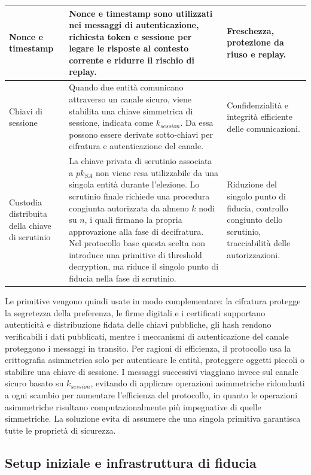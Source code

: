 \documentclass[a4paper,12pt]{article}
\begin{document}
\begin{longtable}{|>{\raggedright\arraybackslash}p{}|>{\raggedright\arraybackslash}p{}|>{\raggedright\arraybackslash}p{}|}
	Nonce e timestamp &
	Nonce e timestamp sono utilizzati nei messaggi di autenticazione, richiesta token e sessione per legare le risposte al contesto corrente e ridurre il rischio di replay. &
	Freschezza, protezione da riuso e replay. \\
	\hline

	Chiavi di sessione &
	Quando due entit\`a comunicano attraverso un canale sicuro, viene stabilita una chiave simmetrica di sessione, indicata come \(k_{session}\). Da essa possono essere derivate sotto-chiavi per cifratura e autenticazione del canale. &
	Confidenzialit\`a e integrit\`a efficiente delle comunicazioni. \\
	\hline

	Custodia distribuita della chiave di scrutinio &
    La chiave privata di scrutinio associata a \(pk_{SA}\) non viene resa utilizzabile da una singola entit\`a durante l'elezione. 
    Lo scrutinio finale richiede una procedura congiunta autorizzata da almeno \(k\) nodi su \(n\), i quali firmano la propria approvazione alla fase di decifratura. 
    Nel protocollo base questa scelta non introduce una primitive di threshold decryption, ma riduce il singolo punto di fiducia nella fase di scrutinio. &
    Riduzione del singolo punto di fiducia, controllo congiunto dello scrutinio, tracciabilit\`a delle autorizzazioni. \\
	\hline
\end{longtable}

Le primitive vengono quindi usate in modo complementare: la cifratura protegge la segretezza della preferenza, le firme digitali e i certificati supportano autenticit\`a e distribuzione fidata delle chiavi pubbliche, gli hash rendono verificabili i dati pubblicati, mentre i meccanismi di autenticazione del canale proteggono i messaggi in transito. 
Per ragioni di efficienza, il protocollo usa la crittografia asimmetrica solo per autenticare le entit\`a, proteggere oggetti piccoli o stabilire una chiave di sessione.
I messaggi successivi viaggiano invece sul canale sicuro basato su \(k_{session}\), evitando di applicare operazioni asimmetriche ridondanti a ogni scambio per aumentare l'efficienza del protocollo, in quanto le operazioni asimmetriche risultano computazionalmente più impegnative di quelle simmetriche.
La soluzione evita di assumere che una singola primitiva garantisca tutte le propriet\`a di sicurezza.

\subsection{Setup iniziale e infrastruttura di fiducia}
\end{document}
